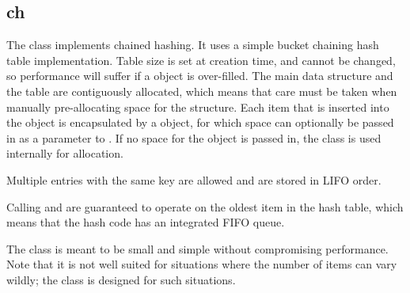 %
%
%
%
%              

\subsection{ch}
\label{ch}
\label{chi}

The  class implements chained hashing.  It uses a simple bucket
chaining hash table implementation.  Table size is set at creation time, and
cannot be changed, so performance will suffer if a  object is
over-filled.  The main  data structure and the table are
contiguously allocated, which means that care must be taken when manually
pre-allocating space for the structure.  Each item that is inserted into the
 object is encapsulated by a  object, for which
space can optionally be passed in as a parameter to .  If no
space for the  object is passed in, the  class is
used internally for allocation.

Multiple entries with the same key are allowed and are stored in LIFO order.

Calling  and  are
guaranteed to operate on the oldest item in the hash table, which means that the
hash code has an integrated FIFO queue.

The  class is meant to be small and simple without compromising
performance.  Note that it is not well suited for situations where the number of
items can vary wildly; the  class is designed for
such situations.

